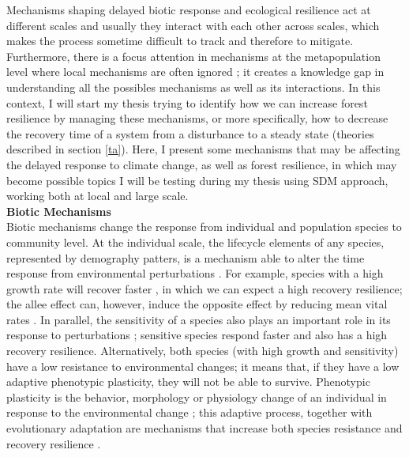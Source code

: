 Mechanisms shaping delayed biotic response and ecological resilience act at different scales and usually they interact with each other across scales, which makes the process sometime difficult to track and therefore to mitigate.
Furthermore, there is a focus attention in mechanisms at the metapopulation level where local mechanisms are often ignored \parencite{Hylander2013}; it creates a knowledge gap in understanding all the possibles mechanisms as well as its interactions.
In this context, I will start my thesis trying to identify how we can increase forest resilience by managing these mechanisms, or more specifically, how to decrease the recovery time of a system from a disturbance to a steady state (theories described in section \ref{ta}).
Here, I present some mechanisms that may be affecting the delayed response to climate change, as well as forest resilience, in which may become possible topics I will be testing during my thesis using SDM approach, working both at local and large scale. \\

\textbf{Biotic Mechanisms} \\
Biotic mechanisms change the response from individual and population species to community level.
At the individual scale, the lifecycle elements of any species, represented by demography patters, is a mechanism able to alter the time response from environmental perturbations \parencite{Bertrand2016}.
For example, species with a high growth rate will recover faster \parencite{Grman2010}, in which we can expect a high recovery resilience; the allee effect can, however, induce the opposite effect by reducing mean vital rates \parencite{Dennis2002}.
In parallel, the sensitivity of a species also plays an important role in its response to perturbations \parencite{Oliver2015,Bertrand2016}; sensitive species respond faster and also has a high recovery resilience.
Alternatively, both species (with high growth and sensitivity) have a low resistance to environmental changes; it means that, if they have a low adaptive phenotypic plasticity, they will not be able to survive.
Phenotypic plasticity is the behavior, morphology or physiology change of an individual in response to the environmental change \parencite{Price2003}; this adaptive process, together with evolutionary adaptation \parencite{Bertrand2016} are mechanisms that increase both species resistance and recovery resilience \parencite{Essl2015,Oliver2015}.


